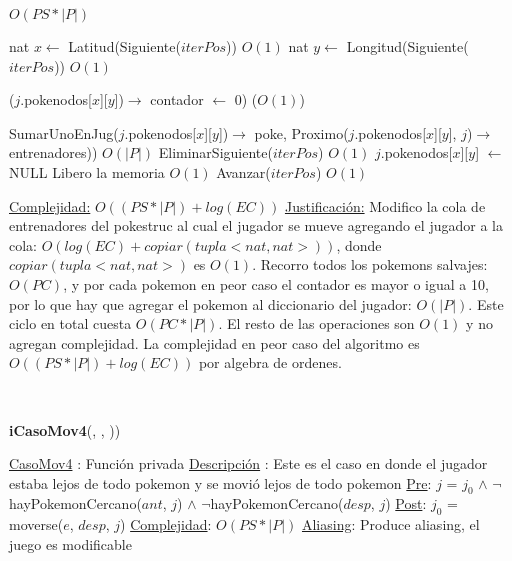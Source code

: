 \begin{Algoritmos}
\begin{algorithmic}[1]
 \Comment $O(PS * |P|)$

  \State nat $x \gets$ Latitud(Siguiente($iterPos$)) \Comment $O(1)$
  \State nat $y \gets$ Longitud(Siguiente($iterPos$)) \Comment $O(1)$   
  
    \State ($j$.pokenodos[$x$][$y$])$\rightarrow$ contador $\gets$ 0) \Comment($O(1)$)
  \EndIf
  
    \State SumarUnoEnJug($j$.pokenodos[$x$][$y$])$\rightarrow$ poke, Proximo($j$.pokenodos[$x$][$y$], $j$)$\rightarrow$ entrenadores)) \Comment $O(|P|)$
    \State EliminarSiguiente($iterPos$) \Comment $O(1)$
    \State $j$.pokenodos[$x$][$y$] $\gets$ NULL \Comment Libero la memoria $O(1)$
  \Else 
    \State Avanzar($iterPos$) \Comment $O(1)$ 
  \EndIf

\EndWhile 

\medskip
\Statex \underline{Complejidad:} $O((PS *|P|) + log(EC))$ 
\Statex \underline{Justificaci\'on:} Modifico la cola de entrenadores del pokestruc al cual el jugador se mueve agregando el jugador a la cola: $O(log(EC) + copiar(tupla <nat, nat>))$, donde $copiar(tupla <nat, nat>)$ es $O(1)$. Recorro todos los pokemons salvajes: $O(PC)$, y por cada pokemon en peor caso el contador es mayor o igual a 10, por lo que hay que agregar el pokemon al diccionario del jugador: $O(|P|)$. Este ciclo en total cuesta $O(PC*|P|)$. El resto de las operaciones son $O(1)$ y no agregan complejidad. La complejidad en peor caso del algoritmo es $O((PS *|P|) + log(EC))$ por algebra de ordenes.
\end{algorithmic}

$ $\newline
$ $\newline


{\textbf{iCasoMov4}(,  , ))}
\begin{algorithmic}[1]

\Statex \underline{CasoMov4} : Funci\'on privada 
\Statex \underline{Descripci\'on} : Este es el caso en donde el jugador estaba lejos de todo pokemon y se movi\'o lejos de todo pokemon
\Statex \underline{Pre}: $j$ = $j_0$ $\land$ $\neg$hayPokemonCercano($ant$, $j$) $\land$ $\neg$hayPokemonCercano($desp$, $j$) 
\Statex \underline{Post}: $j_0$ = moverse($e$, $desp$, $j$) 
\Statex \underline{Complejidad}: $O(PS *|P|)$ 
\Statex \underline{Aliasing}: Produce aliasing, el juego es modificable


\end{algorithmic}
\end{Algoritmos}
